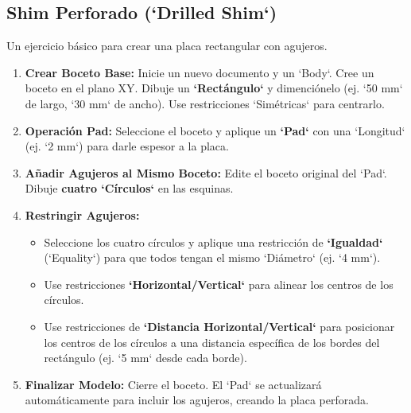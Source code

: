\documentclass[12pt]{article}
\begin{document}
\subsection{Shim Perforado (`Drilled Shim`)}
Un ejercicio básico para crear una placa rectangular con agujeros.
\begin{enumerate}[label=\arabic*)]
    \item \textbf{Crear Boceto Base:} Inicie un nuevo documento y un `Body`. Cree un boceto en el plano XY. Dibuje un \textbf{`Rectángulo`} y dimenciónelo (ej. `50 mm` de largo, `30 mm` de ancho). Use restricciones `Simétricas` para centrarlo.
    \item \textbf{Operación Pad:} Seleccione el boceto y aplique un \textbf{`Pad`} con una `Longitud` (ej. `2 mm`) para darle espesor a la placa.
    \item \textbf{Añadir Agujeros al Mismo Boceto:} Edite el boceto original del `Pad`. Dibuje \textbf{cuatro `Círculos`} en las esquinas.
    \item \textbf{Restringir Agujeros:}
    \begin{itemize}[label=\textendash]
        \item Seleccione los cuatro círculos y aplique una restricción de \textbf{`Igualdad`} (`Equality`) para que todos tengan el mismo `Diámetro` (ej. `4 mm`).
        \item Use restricciones \textbf{`Horizontal/Vertical`} para alinear los centros de los círculos.
        \item Use restricciones de \textbf{`Distancia Horizontal/Vertical`} para posicionar los centros de los círculos a una distancia específica de los bordes del rectángulo (ej. `5 mm` desde cada borde).
    \end{itemize}
    \item \textbf{Finalizar Modelo:} Cierre el boceto. El `Pad` se actualizará automáticamente para incluir los agujeros, creando la placa perforada.
\end{enumerate}
\end{document}

